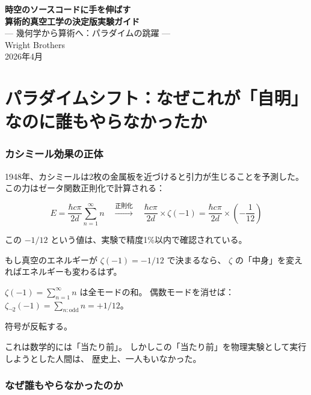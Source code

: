 \documentclass[12pt,a4paper]{article}
\begin{document}
\begin{center}
{\LARGE\bfseries 時空のソースコードに手を伸ばす}\\[0.5cm]
{\Large\bfseries 算術的真空工学の決定版実験ガイド}\\[0.3cm]
{\large --- 幾何学から算術へ：パラダイムの跳躍 ---}\\[1.5cm]
{\large Wright Brothers}\\[0.3cm]
{2026年4月}
\end{center}

\vspace{0.5cm}
\tableofcontents
\newpage

\part{パラダイムシフト：なぜこれが「自明」なのに誰もやらなかったか}

\section{カシミール効果の正体}

1948年、カシミールは2枚の金属板を近づけると引力が生じることを予測した。
この力はゼータ関数正則化で計算される：

$$E = \frac{\hbar c \pi}{2d} \sum_{n=1}^{\infty} n
\quad \xrightarrow{\text{正則化}} \quad
\frac{\hbar c \pi}{2d} \times \zeta(-1) = \frac{\hbar c \pi}{2d} \times \left(-\frac{1}{12}\right)$$

この $-1/12$ という値は、実験で精度1\%以内で確認されている。

\begin{insightbox}
もし真空のエネルギーが $\zeta(-1) = -1/12$ で決まるなら、
$\zeta$ の「中身」を変えればエネルギーも変わるはず。

$\zeta(-1) = \sum_{n=1}^{\infty} n$ は全モードの和。
偶数モードを消せば：
$\zeta_{\neg 2}(-1) = \sum_{n: \text{odd}} n = +1/12$。

符号が反転する。

これは数学的には「当たり前」。
しかしこの「当たり前」を物理実験として実行しようとした人間は、
歴史上、一人もいなかった。
\end{insightbox}

\section{なぜ誰もやらなかったのか}
\end{document}
